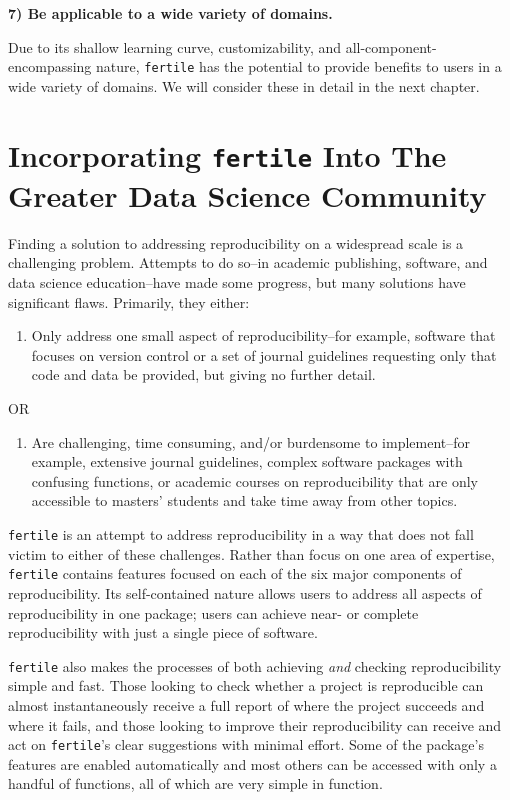 \documentclass[12pt,twoside]{reedthesis}
\providecommand{\tightlist}{%
  \setlength{\itemsep}{0pt}\setlength{\parskip}{0pt}}
\begin{document}
\textbf{7) Be applicable to a wide variety of domains.}

Due to its shallow learning curve, customizability, and all-component-encompassing nature, \texttt{fertile} has the potential to provide benefits to users in a wide variety of domains. We will consider these in detail in the next chapter.

\hypertarget{applications}{%
\chapter{\texorpdfstring{Incorporating \texttt{fertile} Into The Greater Data Science Community}{Incorporating fertile Into The Greater Data Science Community}}\label{applications}}

Finding a solution to addressing reproducibility on a widespread scale is a challenging problem. Attempts to do so--in academic publishing, software, and data science education--have made some progress, but many solutions have significant flaws. Primarily, they either:
\begin{enumerate}
\def\labelenumi{\Alph{enumi})}
\tightlist
\item
  Only address one small aspect of reproducibility--for example, software that focuses on version control or a set of journal guidelines requesting only that code and data be provided, but giving no further detail.
\end{enumerate}
\begin{center}
OR
\end{center}
\begin{enumerate}
\def\labelenumi{\Alph{enumi})}
\setcounter{enumi}{1}
\tightlist
\item
  Are challenging, time consuming, and/or burdensome to implement--for example, extensive journal guidelines, complex software packages with confusing functions, or academic courses on reproducibility that are only accessible to masters' students and take time away from other topics.
\end{enumerate}
\texttt{fertile} is an attempt to address reproducibility in a way that does not fall victim to either of these challenges. Rather than focus on one area of expertise, \texttt{fertile} contains features focused on each of the six major components of reproducibility. Its self-contained nature allows users to address all aspects of reproducibility in one package; users can achieve near- or complete reproducibility with just a single piece of software.

\texttt{fertile} also makes the processes of both achieving \emph{and} checking reproducibility simple and fast. Those looking to check whether a project is reproducible can almost instantaneously receive a full report of where the project succeeds and where it fails, and those looking to improve their reproducibility can receive and act on \texttt{fertile}'s clear suggestions with minimal effort. Some of the package's features are enabled automatically and most others can be accessed with only a handful of functions, all of which are very simple in function.
\end{document}
